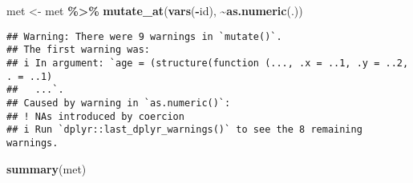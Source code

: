 \documentclass[
]{article}
\newenvironment{Shaded}{\begin{snugshade}}{\end{snugshade}}
\newcommand{\FunctionTok}[1]{\textcolor[rgb]{0.13,0.29,0.53}{\textbf{#1}}}
\newcommand{\NormalTok}[1]{#1}
\newcommand{\OtherTok}[1]{\textcolor[rgb]{0.56,0.35,0.01}{#1}}
\newcommand{\SpecialCharTok}[1]{\textcolor[rgb]{0.81,0.36,0.00}{\textbf{#1}}}
\begin{document}
\begin{Shaded}
\begin{Highlighting}[]
\NormalTok{met }\OtherTok{\textless{}{-}}\NormalTok{ met }\SpecialCharTok{\%\textgreater{}\%} 
  \FunctionTok{mutate\_at}\NormalTok{(}\FunctionTok{vars}\NormalTok{(}\SpecialCharTok{{-}}\NormalTok{id), }\SpecialCharTok{\textasciitilde{}}\FunctionTok{as.numeric}\NormalTok{(.))}
\end{Highlighting}
\end{Shaded}

\begin{verbatim}
## Warning: There were 9 warnings in `mutate()`.
## The first warning was:
## i In argument: `age = (structure(function (..., .x = ..1, .y = ..2, . = ..1)
##   ...`.
## Caused by warning in `as.numeric()`:
## ! NAs introduced by coercion
## i Run `dplyr::last_dplyr_warnings()` to see the 8 remaining warnings.
\end{verbatim}

\begin{Shaded}
\begin{Highlighting}[]
\FunctionTok{summary}\NormalTok{(met)}
\end{Highlighting}
\end{Shaded}
\end{document}
